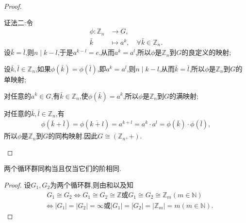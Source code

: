 \documentclass[../../main.tex]{subfiles}%
\begin{document}
\begin{proof}
\begin{enumerate}[(1)]
\begin{enumerate}[(i)]
{\color{blue}证法二:}令
\begin{align*}
\phi: \mathbb{Z}_n &\to G, \\
\bar{k} &\mapsto a^k,\quad \forall \bar{k} \in \mathbb{Z}_n.
\end{align*}
设$\bar{k} = \bar{l}$,则$n \mid k - l$,于是$a^{k-l} = e$,从而$a^k = a^l$,所以$\phi$是$\mathbb{Z}_n$到$G$的良定义的映射;

设$\bar{k},\bar{l} \in \mathbb{Z}_n$,如果$\phi(\bar{k}) = \phi(\bar{l})$,即$a^k = a^l$,则$n \mid k - l$,从而$\bar{k} = \bar{l}$,所以$\phi$是$\mathbb{Z}_n$到$G$的单映射;

对任意的$a^k \in G$,有$\bar{k} \in \mathbb{Z}_n$,使$\phi(\bar{k}) = a^k$,所以$\phi$是$\mathbb{Z}_n$到$G$的满映射;

对任意的$\bar{k},\bar{l} \in \mathbb{Z}_n$,有
\begin{align*}
\phi(\bar{k} + \bar{l}) = \phi(\overline{k + l}) = a^{k+l} = a^k \cdot a^l = \phi(\bar{k}) \cdot \phi(\bar{l}),
\end{align*}
所以$\phi$是$\mathbb{Z}_n$到$G$的同构映射.因此$G \cong (\mathbb{Z}_n,+)$.
\end{enumerate}
\end{enumerate}

\end{proof}

\begin{corollary}
两个循环群同构当且仅当它们的阶相同.
\end{corollary}
\begin{proof}

设$G_1,G_2$为两个循环群,则由和以及知
\begin{align*}
&\,\,G_1\cong G_2\iff G_1\cong G_2\cong \mathbb{Z}\text{或}G_1\cong G_2\cong \mathbb{Z}_m(m\in \mathbb{N})\\
&\iff |G_1|=|G_2|=\infty\text{或}|G_1|=|G_2|=|\mathbb{Z}_m|=m(m\in \mathbb{N}).
\end{align*}

\end{proof}
\end{document}
